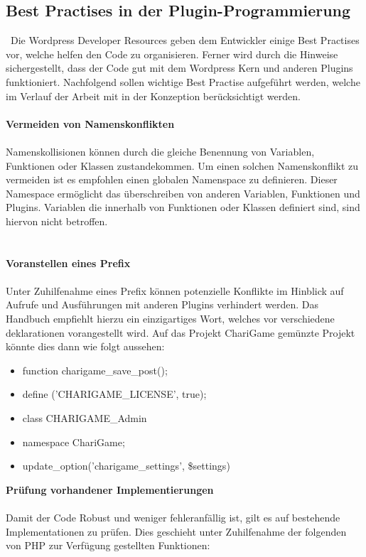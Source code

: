 \subsection{Best Practises in der Plugin-Programmierung}\
Die Wordpress Developer Resources geben dem Entwickler einige Best Practises vor, welche helfen den Code zu organisieren.
Ferner wird durch die Hinweise sichergestellt, dass der Code gut mit dem Wordpress Kern und anderen Plugins funktioniert.
Nachfolgend sollen wichtige Best Practise aufgeführt werden, welche im Verlauf der Arbeit mit in der Konzeption berücksichtigt werden.
\\
\\
\textbf{Vermeiden von Namenskonflikten}\\\\
Namenskollisionen können durch die gleiche Benennung von Variablen, Funktionen oder Klassen zustandekommen.
Um einen solchen Namenskonflikt zu vermeiden ist es empfohlen einen globalen Namenspace zu definieren.
Dieser Namespace ermöglicht das überschreiben von anderen Variablen, Funktionen und Plugins.
Variablen die innerhalb von Funktionen oder Klassen definiert sind, sind hiervon nicht betroffen.
\\
\\
\\
\textbf{Voranstellen eines Prefix}\\\\
Unter Zuhilfenahme eines Prefix können potenzielle Konflikte im Hinblick auf Aufrufe und Ausführungen mit anderen Plugins verhindert werden.
Das Handbuch empfiehlt hierzu ein einzigartiges Wort, welches vor verschiedene deklarationen vorangestellt wird.
Auf das Projekt ChariGame gemünzte Projekt könnte dies dann wie folgt aussehen:
\begin{itemize}
 \item function charigame\_save\_post();
 \item define ('CHARIGAME\_LICENSE', true);
 \item class CHARIGAME\_Admin{}
 \item namespace ChariGame;
 \item update\_option('charigame\_settings', \$settings)
\end{itemize}
\vspace{1em}
\textbf{Prüfung vorhandener Implementierungen}\\\\
Damit der Code Robust  und weniger fehleranfällig ist, gilt es auf bestehende Implementationen zu prüfen.
Dies geschieht unter Zuhilfenahme der folgenden von PHP zur Verfügung gestellten Funktionen:
